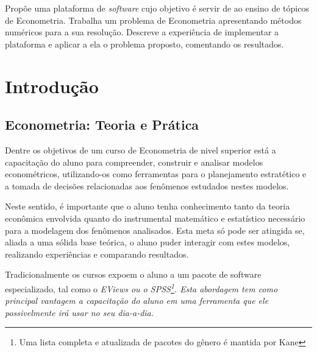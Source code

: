 \documentclass{abnt}
\begin{document}
\folhaderosto
\addtocounter{page}{1}

\vspace{4cm}
Propõe uma plataforma de \textit{software} cujo objetivo é servir de ao ensino de tópicos de Econometria. Trabalha um problema de Econometria apresentando métodos numéricos para a sua resolução. Descreve a experiência de implementar a plataforma e aplicar a ela o problema proposto, comentando os resultados.


\newpage




\sumario

\chapter{Introdução}
\label{cap_problema}

\section{Econometria: Teoria e Prática}

Dentre os objetivos de um curso de Econometria de nivel superior está a capacitação do aluno para compreender, construir e analisar modelos econométricos, utilizando-os como ferramentas para o planejamento estratético e a tomada de decisões relacionadas aos fenômenos estudados nestes modelos.

Neste sentido, é importante que o aluno tenha conhecimento tanto da teoria econômica envolvida quanto do instrumental matemático e estatístico necessário para a modelagem dos fenômenos analisados. Esta meta só pode ser atingida se, aliada a uma sólida base teórica, o aluno puder interagir com estes modelos, realizando experiências e comparando resultados.

Tradicionalmente os cursos expoem o aluno a um pacote de software especializado, tal como o \em{EViews} ou o \em{SPSS}\footnote{Uma lista completa e atualizada de pacotes do gênero é mantida por Kane\cite{web:econsoftware}}. Esta abordagem tem como principal vantagem a capacitação do aluno em uma ferramenta que ele possivelmente irá usar no seu dia-a-dia. 
\end{document}
